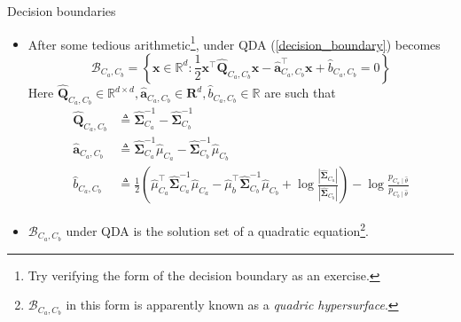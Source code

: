 \documentclass{beamer}
\numberwithin{equation}{section}
\newcommand{\aref}[1]{\alert{\ref{#1}}}
\begin{document}
\begin{frame}{Decision boundaries}
    \begin{itemize}
        \item
        After some tedious arithmetic\footnote{
            Try verifying the form of the decision boundary as an exercise.      
        }, under QDA (\aref{decision_boundary})
        becomes
        \begin{equation} \label{qda_decision_boundary}
            \mathcal{B}_{C_a, C_b} = \left\{
                \mathbf{x} \in \mathbb{R}^d : \frac{1}{2}
                \mathbf{x}^\top\hat{\mathbf{Q}}_{C_a, C_b}\mathbf{x} -
                \hat{\mathbf{a}}_{C_a, C_b}^\top\mathbf{x} +
                \hat{b}_{C_a, C_b} = 0
            \right\}
        \end{equation}
        Here $ \hat{\mathbf{Q}}_{C_a, C_b} \in \mathbb{R}^{d \times d},
        \hat{\mathbf{a}}_{C_a, C_b} \in \mathbf{R}^d, \hat{b}_{C_a, C_b} \in
        \mathbb{R} $ are such that
        \begin{equation*}%
            \begin{split}
            \hat{\mathbf{Q}}_{C_a, C_b} & \triangleq
                \hat{\mathbf{\Sigma}}_{C_a}^{-1} -
                \hat{\mathbf{\Sigma}}_{C_b}^{-1} \\
            \hat{\mathbf{a}}_{C_a, C_b} & \triangleq
                \hat{\mathbf{\Sigma}}_{C_a}^{-1}\hat{\mu}_{C_a} -
                \hat{\mathbf{\Sigma}}_{C_b}^{-1}\hat{\mu}_{C_b} \\
            \hat{b}_{C_a, C_b} & \triangleq
                \frac{1}{2}\left(
                    \hat{\mu}_{C_a}^\top
                    \hat{\mathbf{\Sigma}}_{C_a}^{-1}\hat{\mu}_{C_a} -
                    \hat{\mu}_b^\top
                    \hat{\mathbf{\Sigma}}_{C_b}^{-1}\hat{\mu}_{C_b} +
                    \log\frac{
                        |\hat{\mathbf{\Sigma}}_{C_a}|
                    }{|\hat{\mathbf{\Sigma}}_{C_b}|}
                \right) - \log\frac{p_{C_a \mid \hat{\theta}}}{
                    p_{C_b \mid \hat{\theta}}
                }
            \end{split}
        \end{equation*}

        \vspace{-5 pt}

        \item
        $ \mathcal{B}_{C_a, C_b} $ under QDA is the solution set of a
        quadratic equation\footnote{
            $ \mathcal{B}_{C_a, C_b} $ in this form is apparently known as a
            \textit{quadric hypersurface}.        
        }.
    \end{itemize}

    \medskip
\end{frame}
\end{document}
